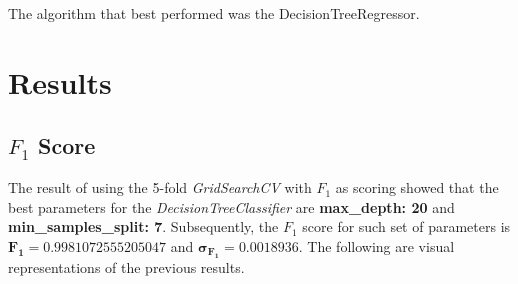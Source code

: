 \documentclass[a4paper]{article}
\begin{document}
The algorithm that best performed was the DecisionTreeRegressor.

\section{Results}
\subsection{$F_1$ Score}
The result of using the 5-fold \textit{GridSearchCV} with $F_1$ as scoring showed that the best parameters for the \textit{DecisionTreeClassifier} are \textbf{max\_depth: 20} and \textbf{min\_samples\_split: 7}. Subsequently, the $F_1$ score for such set of parameters is $\mathbf{F_1=0.9981072555205047}$ and $\mathbf{\sigma_{F_1}=0.0018936}$. The following are visual representations of the previous results.
\end{document}
